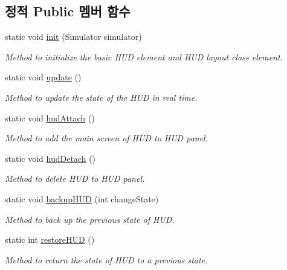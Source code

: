 \subsection*{정적 Public 멤버 함수}
\begin{DoxyCompactItemize}
\item 
static void \hyperlink{classkr_1_1ac_1_1kookmin_1_1cs_1_1hud_1_1_h_u_d_management_a09bdb891071027c0834bb5e300dbd530}{init} (Simulator simulator)
\begin{DoxyCompactList}\small\item\em Method to initialize the basic H\+U\+D element and H\+U\+D layout class element. \end{DoxyCompactList}\item 
static void \hyperlink{classkr_1_1ac_1_1kookmin_1_1cs_1_1hud_1_1_h_u_d_management_a0aa136c1c12cdff5b49304a0b750d3bb}{update} ()
\begin{DoxyCompactList}\small\item\em Method to update the state of the H\+U\+D in real time. \end{DoxyCompactList}\item 
static void \hyperlink{classkr_1_1ac_1_1kookmin_1_1cs_1_1hud_1_1_h_u_d_management_aa5add7f6fd1b0015e8b55a5e1edbd9e0}{hud\+Attach} ()
\begin{DoxyCompactList}\small\item\em Method to add the main screen of H\+U\+D to H\+U\+D panel. \end{DoxyCompactList}\item 
static void \hyperlink{classkr_1_1ac_1_1kookmin_1_1cs_1_1hud_1_1_h_u_d_management_aebd2c1a29ca7f1ccc3002126f6386f9e}{hud\+Detach} ()
\begin{DoxyCompactList}\small\item\em Method to delete H\+U\+D to H\+U\+D panel. \end{DoxyCompactList}\item 
static void \hyperlink{classkr_1_1ac_1_1kookmin_1_1cs_1_1hud_1_1_h_u_d_management_aa3589b792b8862b3a04c58a6eb52ea23}{backup\+H\+U\+D} (int change\+State)
\begin{DoxyCompactList}\small\item\em Method to back up the previous state of H\+U\+D. \end{DoxyCompactList}\item 
static int \hyperlink{classkr_1_1ac_1_1kookmin_1_1cs_1_1hud_1_1_h_u_d_management_a946946e34bd696cf5d51c9d7bd2da38e}{restore\+H\+U\+D} ()
\begin{DoxyCompactList}\small\item\em Method to return the state of H\+U\+D to a previous state. \end{DoxyCompactList}\item 

\end{DoxyCompactItemize}
